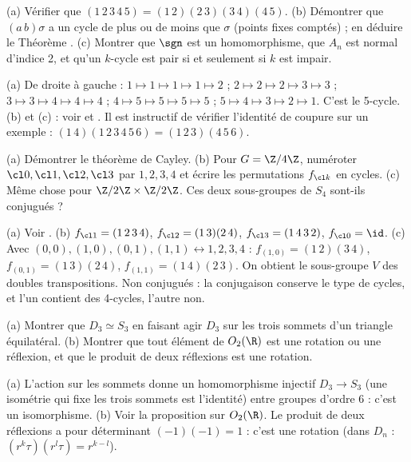 \begin{exo}[A][Parité]
(a) Vérifier que $(1\,2\,3\,4\,5)=(1\,2)(2\,3)(3\,4)(4\,5)$. (b) Démontrer que $(a\,b)\sigma$ a un cycle de plus ou de moins que $\sigma$ (points fixes comptés) ; en déduire le Théorème . (c) Montrer que $\sgn$ est un homomorphisme, que $A_n$ est normal d'indice 2, et qu'un $k$-cycle est pair si et seulement si $k$ est impair.
\begin{corrige}
(a) De droite à gauche : $1\mapsto1\mapsto1\mapsto1\mapsto2$ ; $2\mapsto2\mapsto2\mapsto3\mapsto3$ ; $3\mapsto3\mapsto4\mapsto4\mapsto4$ ; $4\mapsto5\mapsto5\mapsto5\mapsto5$ ; $5\mapsto4\mapsto3\mapsto2\mapsto1$. C'est le 5-cycle. (b) et (c) : voir  et . Il est instructif de vérifier l'identité de coupure sur un exemple : $(1\,4)(1\,2\,3\,4\,5\,6)=(1\,2\,3)(4\,5\,6)$.
\end{corrige}
\end{exo}
\begin{exo}
(a) Démontrer le théorème de Cayley. (b) Pour $G=\Z/4\Z$, numéroter $\cl0,\cl1,\cl2,\cl3$ par $1,2,3,4$ et écrire les permutations $f_{\cl k}$ en cycles. (c) Même chose pour $\Z/2\Z\times\Z/2\Z$. Ces deux sous-groupes de $S_4$ sont-ils conjugués ?
\begin{corrige}
(a) Voir . (b) $f_{\cl1}=(1\,2\,3\,4)$, $f_{\cl2}=(1\,3)(2\,4)$, $f_{\cl3}=(1\,4\,3\,2)$, $f_{\cl0}=\id$. (c) Avec $(0,0),(1,0),(0,1),(1,1)\leftrightarrow1,2,3,4$ : $f_{(1,0)}=(1\,2)(3\,4)$, $f_{(0,1)}=(1\,3)(2\,4)$, $f_{(1,1)}=(1\,4)(2\,3)$. On obtient le sous-groupe $V$ des doubles transpositions. Non conjugués : la conjugaison conserve le type de cycles, et l'un contient des 4-cycles, l'autre non.
\end{corrige}
\end{exo}
\begin{exo}[A][$S_3$ et $D_3$, $O_2(\R)$]
(a) Montrer que $D_3\simeq S_3$ en faisant agir $D_3$ sur les trois sommets d'un triangle équilatéral. (b) Montrer que tout élément de $O_2(\R)$ est une rotation ou une réflexion, et que le produit de deux réflexions est une rotation.
\begin{corrige}
(a) L'action sur les sommets donne un homomorphisme injectif $D_3\to S_3$ (une isométrie qui fixe les trois sommets est l'identité) entre groupes d'ordre 6 : c'est un isomorphisme. (b) Voir la proposition sur $O_2(\R)$. Le produit de deux réflexions a pour déterminant $(-1)(-1)=1$ : c'est une rotation (dans $D_n$ : $(r^k\tau)(r^l\tau)=r^{k-l}$).
\end{corrige}
\end{exo}
